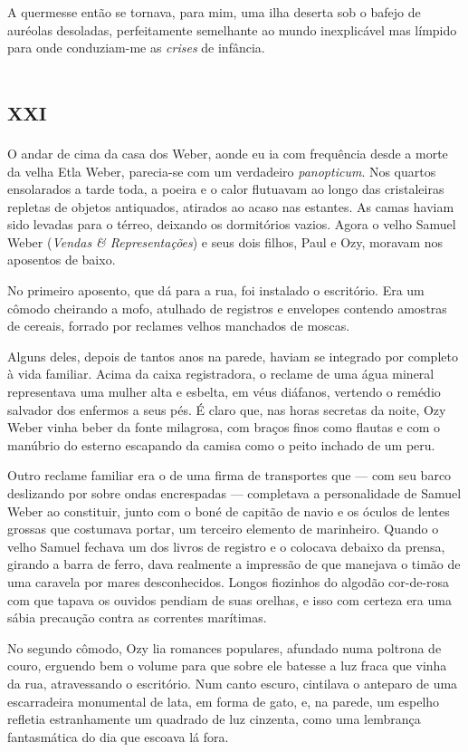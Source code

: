 A quermesse então se tornava, para mim, uma ilha deserta sob o bafejo de auréolas desoladas, perfeitamente semelhante ao mundo inexplicável mas límpido para onde conduziam-me as \textit{crises} de infância.


\chapter*{\huge\centering\textsc{xxi}}

O andar de cima da casa dos Weber, aonde eu ia com frequência desde a morte da velha Etla Weber, parecia-se com um verdadeiro \textit{panopticum}. Nos quartos ensolarados a tarde toda, a poeira e o calor flutuavam ao longo das cristaleiras repletas de objetos antiquados, atirados ao acaso nas estantes. As camas haviam sido levadas para o térreo, deixando os dormitórios vazios. Agora o velho Samuel Weber (\emph{Vendas \& Representações}) e seus dois filhos, Paul e Ozy, moravam nos aposentos de baixo.

No primeiro aposento, que dá para a rua, foi instalado o escritório. Era um cômodo cheirando a mofo, atulhado de registros e envelopes contendo amostras de cereais, forrado por reclames velhos manchados de moscas.

Alguns deles, depois de tantos anos na parede, haviam se integrado por completo à vida familiar. Acima da caixa registradora, o reclame de uma água mineral representava uma mulher alta e esbelta, em véus diáfanos, vertendo o remédio salvador dos enfermos a seus pés. É claro que, nas horas secretas da noite, Ozy Weber vinha beber da fonte milagrosa, com braços finos como flautas e com o manúbrio do esterno escapando da camisa como o peito inchado de um peru.

Outro reclame familiar era o de uma firma de transportes que --- com seu barco deslizando por sobre ondas encrespadas --- completava a personalidade de Samuel Weber ao constituir, junto com o boné de capitão de navio e os óculos de lentes grossas que costumava portar, um terceiro elemento de marinheiro. Quando o velho Samuel fechava um dos livros de registro e o colocava debaixo da prensa, girando a barra de ferro, dava realmente a impressão de que manejava o timão de uma caravela por mares desconhecidos. Longos fiozinhos do algodão cor-de-rosa com que tapava os ouvidos pendiam de suas orelhas, e isso com certeza era uma sábia precaução contra as correntes marítimas.

No segundo cômodo, Ozy lia romances populares, afundado numa poltrona de couro, erguendo bem o volume para que sobre ele batesse a luz fraca que vinha da rua, atravessando o escritório. Num canto escuro, cintilava o anteparo de uma escarradeira monumental de lata, em forma de gato, e, na parede, um espelho refletia estranhamente um quadrado de luz cinzenta, como uma lembrança fantasmática do dia que escoava lá fora.


